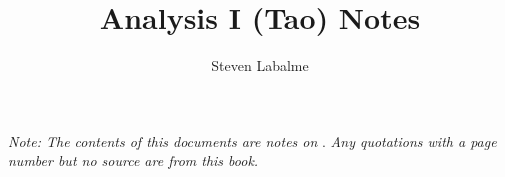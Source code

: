 \documentclass{report}
\title{Analysis I (Tao) Notes}
\author{Steven Labalme}
\begin{document}
\maketitle



\tableofcontents
\thispagestyle{plain}
\bigskip
\emph{Note: The contents of this documents are notes on} \cite{bib:AnalysisI}. \emph{Any quotations with a page number but no source are from this book.}
\newpage




\pagestyle{fancy}
\renewcommand{\chaptermark}[1]{\markboth{Chapter \thechapter: #1}{}}
\fancyhf{}
\lhead{\leftmark}





\begin{appendices}
    
\end{appendices}



\end{document}
